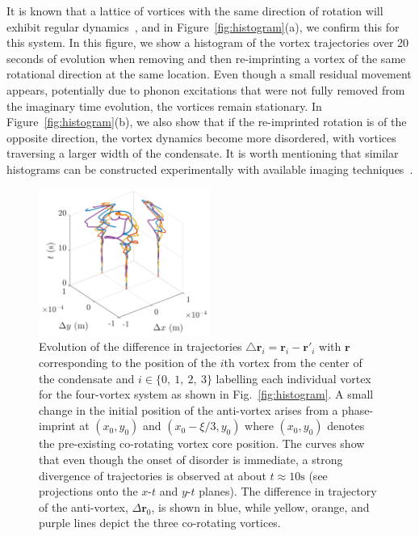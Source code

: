 It is known that a lattice of vortices with the same direction of rotation will exhibit regular dynamics~\cite{abo2001}, and in Figure~\ref{fig:histogram}(a), we confirm this for this system.
In this figure, we show a histogram of the vortex trajectories over 20 seconds of evolution when removing and then re-imprinting a vortex of the same rotational direction at the same location.
Even though a small residual movement appears, potentially due to phonon excitations that were not fully removed from the imaginary time evolution, the vortices remain stationary.
In Figure~\ref{fig:histogram}(b), we also show that if the re-imprinted rotation is of the opposite direction, the vortex dynamics become more disordered, with vortices traversing a larger width of the condensate.
It is worth mentioning that similar histograms can be constructed experimentally with available imaging techniques~\cite{wilson2015,freilich2010}.

\begin{figure}
\center \includegraphics[width=0.5\textwidth]{data/2d/evolution/evolution}

\caption{
Evolution of the difference in trajectories $\triangle \textbf{r}_i = \textbf{r}_{i}-\textbf{r}'_{i}$ with $\textbf{r}$ corresponding to the position of the $i$th vortex from the center of the condensate and $i\in \{0,\ 1,\ 2,\ 3\}$ labelling each individual vortex for the four-vortex system as shown in Fig.~\ref{fig:histogram}.
A small change in the initial position of the anti-vortex arises from a phase-imprint at $(x_{0},y_{0})$ and $(x_{0}-\xi/3,y_{0})$ where $(x_{0},y_{0})$ denotes the pre-existing co-rotating vortex core position.
The curves show that even though the onset of disorder is immediate, a strong divergence of trajectories is observed at about $t\approx 10 \text{s}$ (see projections onto the $x$-$t$ and $y$-$t$ planes).
The difference in trajectory of the anti-vortex, $\Delta \mathbf{r}_0$, is shown in blue, while yellow, orange, and purple lines depict the three co-rotating vortices.
}
\label{fig:evolution}
\end{figure}

